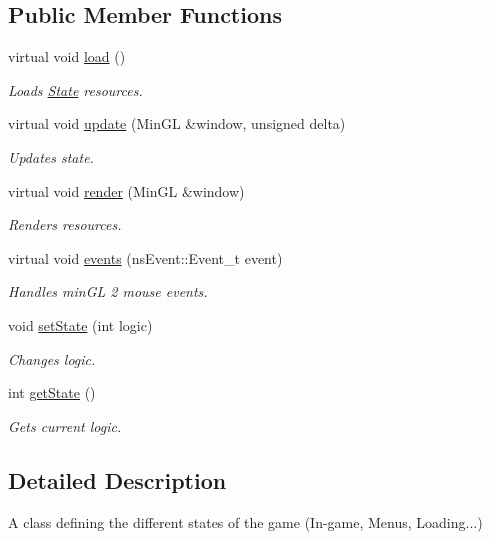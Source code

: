 \subsection*{Public Member Functions}
\begin{DoxyCompactItemize}
\item 
virtual void \hyperlink{classns_game_1_1_state_a8644de505f7a84933f6d6e6651205791}{load} ()
\begin{DoxyCompactList}\small\item\em Loads \hyperlink{classns_game_1_1_state}{State} resources. \end{DoxyCompactList}\item 
virtual void \hyperlink{classns_game_1_1_state_ae809e89ac9df4a43ab90d5d5932e2bc7}{update} (Min\+GL \&window, unsigned delta)
\begin{DoxyCompactList}\small\item\em Updates state. \end{DoxyCompactList}\item 
virtual void \hyperlink{classns_game_1_1_state_a214f8ee52de4b318f1ed3861a578ce67}{render} (Min\+GL \&window)
\begin{DoxyCompactList}\small\item\em Renders resources. \end{DoxyCompactList}\item 
virtual void \hyperlink{classns_game_1_1_state_a2e1daaca20e580bdb4baf8215e1b51c9}{events} (ns\+Event\+::\+Event\+\_\+t event)
\begin{DoxyCompactList}\small\item\em Handles min\+GL 2 mouse events. \end{DoxyCompactList}\item 
void \hyperlink{classns_game_1_1_state_adab442cc7a1edda5adaa55e8d510633f}{set\+State} (int logic)
\begin{DoxyCompactList}\small\item\em Changes logic. \end{DoxyCompactList}\item 
int \hyperlink{classns_game_1_1_state_abcc65369e15769b5c6ae588f61beeb02}{get\+State} ()
\begin{DoxyCompactList}\small\item\em Gets current logic. \end{DoxyCompactList}\end{DoxyCompactItemize}


\subsection{Detailed Description}
A class defining the different states of the game (In-\/game, Menus, Loading...) 

